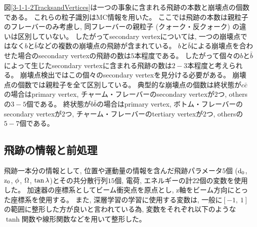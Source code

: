図\ref{3-1-1-2TracksandVertices}は一つの事象に含まれる飛跡の本数と崩壊点の個数である。
これらの粒子識別はMC情報を用いた。
ここでは飛跡の本数は親粒子のフレーバーのみ考慮し, 同フレーバーの親粒子 (クォーク・反クォーク) の違いは区別していない。
したがってsecondary vertexについては, 一つの崩壊点ではなく$b$と$\bar{b}$などの複数の崩壊点の飛跡が含まれている。
$b$と$\bar{b}$による崩壊点を合わせた場合のsecondary vertexの飛跡の数は$5$本程度である。
したがって個々の$b$と$\bar{b}$によって生じたsecondary vertexに含まれる飛跡の数は$2-3$本程度と考えられる。
崩壊点検出ではこの個々のsecondary vertexを見分ける必要がある。
崩壊点の個数では親粒子を全て区別している。
典型的な崩壊点の個数は終状態が$c\bar{c}$の場合はprimary vertex, チャーム・フレーバーのsecondary vertexが$2$つ, othersの$3-5$個である。
終状態が$b\bar{b}$の場合はprimary vertex, ボトム・フレーバーのsecondary vertexが$2$つ, チャーム・フレーバーのtertiary vertexが$2$つ, othersの$5-7$個である。


\subsection{飛跡の情報と前処理} \label{Net:Data:TrackInformationandPreprocessing}

飛跡一本分の情報として, 位置や運動量の情報を含んだ飛跡パラメータ$5$個 ($\rm d_0$, $\rm z_0$, $\rm \phi$, $\rm \Omega$, $\rm \tan{\lambda}$)\cite{TrackParametersLCIO}とその共分散行列$15$個, 電荷, エネルギーの計$22$個の変数を使用した。
加速器の座標系としてビーム衝突点を原点とし, z軸をビーム方向にとった座標系を使用する。
また, 深層学習の学習に使用する変数は, 一般に$[-1,\ 1]$の範囲に整形した方が良いと言われている為, 変数をそれぞれ以下のような$\tanh$関数や線形関数などを用いて整形した。

